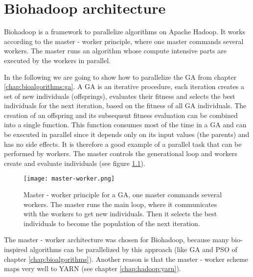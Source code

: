\chapter{Biohadoop architecture}
\label{chap:impl}

Biohadoop is a framework to parallelize algorithms on Apache Hadoop. It works according to the master - worker principle, where one master commands several workers. The master runs an algorithm whose compute intensive parts are executed by the workers in parallel.

In the following we are going to show how to parallelize the GA from chapter \ref{chap:bioalgorithms:ga}. A GA is an iterative procedure, each iteration creates a set of new individuals (offsprings), evaluates their fitness and selects the best individuals for the next iteration, based on the fitness of all GA individuals. The creation of an offspring and its subsequent fitness evaluation can be combined into a single function. This function consumes most of the time in a GA and can be executed in parallel since it depends only on its input values (the parents) and has no side effects. It is therefore a good example of a parallel task that can be performed by workers. The master controls the generational loop and workers create and evaluate individuals (see figure \ref{fig:master-worker}).


\begin{figure}[ht!]
  \centering
  \texttt{[image: master-worker.png]}
  \caption{Master - worker principle for a GA, one master commands several workers. The master runs the main loop, where it communicates with the workers to get new individuals. Then it selects the best individuals to become the population of the next iteration.}
  \label{fig:master-worker}
\end{figure}

The master - worker architecture was chosen for Biohadoop, because many bio-inspired algorithms can be parallelized by this approach (like GA and PSO of chapter \ref{chap:bioalgorithms}). Another reason is that the master - worker scheme maps very well to YARN (see chapter \ref{chap:hadoop:yarn}).

